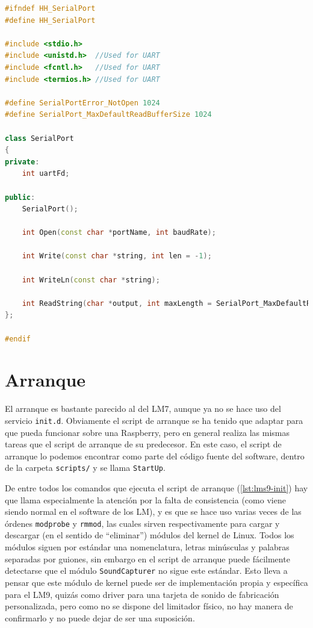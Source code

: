 \begin{lstlisting}[language=c++, caption={Clase SerialPort}, label={lst:lms9-serialport}]
#ifndef HH_SerialPort
#define HH_SerialPort

#include <stdio.h>
#include <unistd.h>	 //Used for UART
#include <fcntl.h>	 //Used for UART
#include <termios.h> //Used for UART

#define SerialPortError_NotOpen 1024
#define SerialPort_MaxDefaultReadBufferSize 1024

class SerialPort
{
private:
	int uartFd;

public:
	SerialPort();

	int Open(const char *portName, int baudRate);

	int Write(const char *string, int len = -1);

	int WriteLn(const char *string);

	int ReadString(char *output, int maxLength = SerialPort_MaxDefaultReadBufferSize);
};

#endif
\end{lstlisting}

\clearpage
\section{Arranque}

El arranque es bastante parecido al del LM7, aunque ya no se hace uso del servicio \verb|init.d|. Obviamente el script de arranque se ha tenido que adaptar para que pueda funcionar sobre una Raspberry, pero en general realiza las mismas tareas que el script de arranque de su predecesor. En este caso, el script de arranque lo podemos encontrar como parte del código fuente del software, dentro de la carpeta \verb|scripts/| y se llama \verb|StartUp|.

De entre todos los comandos que ejecuta el script de arranque (\ref{lst:lms9-init}) hay que llama especialmente la atención por la falta de consistencia (como viene siendo normal en el software de los LM), y es que se hace uso varias veces de las órdenes \verb|modprobe| y \verb|rmmod|, las cuales sirven respectivamente para cargar y descargar (en el sentido de ``eliminar'') módulos del kernel de Linux. Todos los módulos siguen por estándar una nomenclatura, letras minúsculas y palabras separadas por guiones, sin embargo en el script de arranque puede fácilmente detectarse que el módulo \verb|SoundCapturer| no sigue este estándar. Esto lleva a pensar que este módulo de kernel puede ser de implementación propia y específica para el LM9, quizás como driver para una tarjeta de sonido de fabricación personalizada, pero como no se dispone del limitador físico, no hay manera de confirmarlo y no puede dejar de ser una suposición. \\

